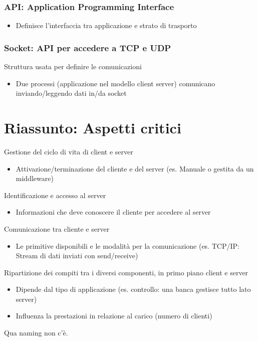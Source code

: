 \subsubsection{API: Application Programming Interface}
\begin{itemize}
    \item Definisce l'interfaccia tra applicazione e strato di trasporto
\end{itemize}
\subsubsection{Socket: API per accedere a TCP e UDP}
Struttura usata per definire le comunicazioni
\begin{itemize}
    \item Due processi (applicazione nel modello client server) comunicano inviando/leggendo dati in/da socket
\end{itemize}

\section{Riassunto: Aspetti critici}
Gestione del ciclo di vita di client e server
\begin{itemize}
    \item Attivazione/terminazione del cliente e del server (es. Manuale o gestita da un middleware)
\end{itemize}
Identificazione e accesso al server
\begin{itemize}
    \item Informazioni che deve conoscere il cliente per accedere al server
\end{itemize}
Comunicazione tra cliente e server
\begin{itemize}
    \item Le primitive disponibili e le modalità per la comunicazione (es. TCP/IP: Stream di dati inviati con send/receive)
\end{itemize}
Ripartizione dei compiti tra i diversi componenti, in primo piano client e server
\begin{itemize}
    \item Dipende dal tipo di applicazione (es. controllo: una banca gestisce tutto lato server)
    \item Influenza la prestazioni in relazione al carico (numero di clienti)
\end{itemize}
Qua naming non c'è.


